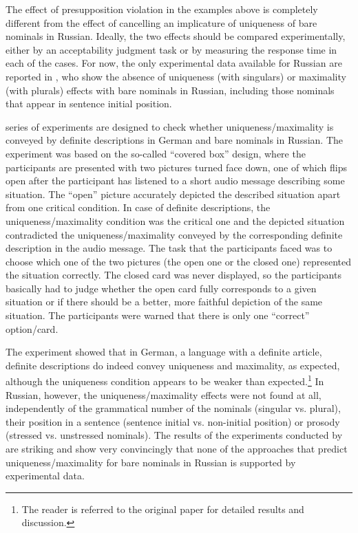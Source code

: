 \documentclass[output=paper,colorlinks,citecolor=brown]{langscibook}
\begin{document}
\noindent The effect of presupposition violation in the examples above is completely different from the effect of cancelling an implicature of uniqueness of bare nominals in Russian. Ideally, the two effects should be compared experimentally, either by an acceptability judgment task or by measuring the response time in each of the cases. For now, the only experimental data available for Russian are reported in \citet{simikdemian20}, who show the absence of uniqueness (with singulars) or maximality (with plurals) effects with bare nominals in Russian, including those nominals that appear in sentence initial position. 

 series of experiments are designed to check whether uniqueness/maximality is conveyed by definite descriptions in German and bare nominals in Russian. The experiment was based on the so-called ``covered box'' design, where the participants are presented with two pictures turned face down, one of which flips open after the participant has listened to a short audio message describing some situation. The ``open'' picture accurately depicted the described situation apart from one critical condition. In case of definite descriptions, the uniqueness/maximality condition was the critical one and the depicted situation contradicted the uniqueness/maximality conveyed by the corresponding definite description in the audio message. The task that the participants faced was to choose which one of the two pictures (the open one or the closed one) represented the situation correctly. The closed card was never displayed, so the participants basically had to judge whether the open card fully corresponds to a given situation or if there should be a better, more faithful depiction of the same situation. The participants were warned that there is only one ``correct'' option/card. 

The experiment showed that in German, a language with a definite article, definite descriptions do indeed convey uniqueness and maximality, as expected, although the uniqueness condition appears to be weaker than expected.\footnote{The reader is referred to the original paper for detailed results and discussion.}
In Russian, however, the uniqueness/maximality effects were not found at all, independently of the grammatical number of the nominals (singular vs. plural), their position in a sentence (sentence initial vs. non-initial position) or prosody (stressed vs. unstressed nominals). The results of the experiments conducted by \citet{simikdemian20} are striking and show very convincingly that none of the approaches that predict uniqueness/maximality for bare nominals in Russian is supported by experimental data. 
\end{document}
